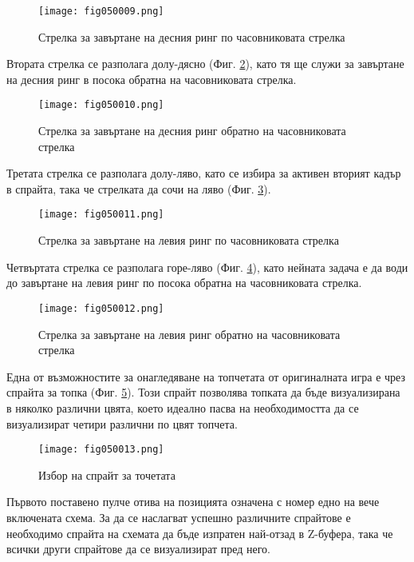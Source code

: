 \begin{figure}[H]
  \centering
  \texttt{[image: fig050009.png]}
  \caption{Стрелка за завъртане на десния ринг по часовниковата стрелка}
\label{fig050009}
\end{figure}

Втората стрелка се разполага долу-дясно (Фиг. \ref{fig050010}), като тя ще служи за завъртане на десния ринг в посока обратна на часовниковата стрелка.

\begin{figure}[H]
  \centering
  \texttt{[image: fig050010.png]}
  \caption{Стрелка за завъртане на десния ринг обратно на часовниковата стрелка}
\label{fig050010}
\end{figure}

Третата стрелка се разполага долу-ляво, като се избира за активен вторият кадър в спрайта, така че стрелката да сочи на ляво (Фиг. \ref{fig050011}).

\begin{figure}[H]
  \centering
  \texttt{[image: fig050011.png]}
  \caption{Стрелка за завъртане на левия ринг по часовниковата стрелка}
\label{fig050011}
\end{figure}

Четвъртата стрелка се разполага горе-ляво (Фиг. \ref{fig050012}), като нейната задача е да води до завъртане на левия ринг по посока обратна на часовниковата стрелка.

\begin{figure}[H]
  \centering
  \texttt{[image: fig050012.png]}
  \caption{Стрелка за завъртане на левия ринг обратно на часовниковата стрелка}
\label{fig050012}
\end{figure}

Една от възможностите за онагледяване на топчетата от оригиналната игра е чрез спрайта за топка (Фиг. \ref{fig050013}). Този спрайт позволява топката да бъде визуализирана в няколко различни цвята, което идеално пасва на необходимостта да се визуализират четири различни по цвят топчета.

\begin{figure}[H]
  \centering
  \texttt{[image: fig050013.png]}
  \caption{Избор на спрайт за точетата}
\label{fig050013}
\end{figure}

Първото поставено пулче отива на позицията означена с номер едно на вече включената схема. За да се наслагват успешно различните спрайтове е необходимо спрайта на схемата да бъде изпратен най-отзад в Z-буфера, така че всички други спрайтове да се визуализират пред него. 

